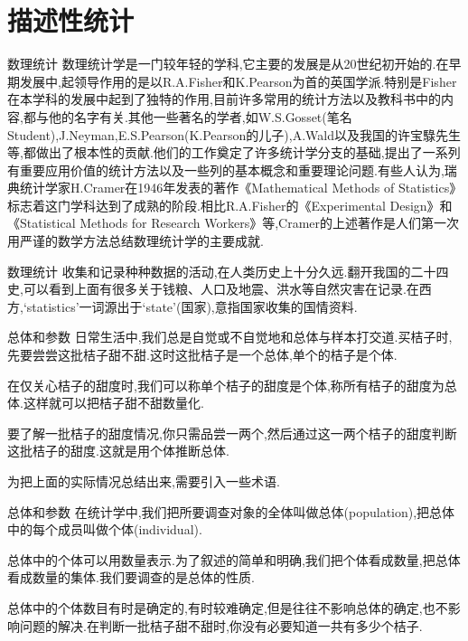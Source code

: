 \section{描述性统计}
    
    \frame{\sectionpage}
    
    \begin{frame}{数理统计}
数理统计学是一门较年轻的学科,它主要的发展是从20世纪初开始的.在早期发展中,起领导作用的是以R.A.Fisher和K.Pearson为首的英国学派.特别是Fisher在本学科的发展中起到了独特的作用,目前许多常用的统计方法以及教科书中的内容,都与他的名字有关.其他一些著名的学者,如W.S.Gosset(笔名Student),J.Neyman,E.S.Pearson(K.Pearson的儿子),A.Wald以及我国的许宝騄先生等,都做出了根本性的贡献.他们的工作奠定了许多统计学分支的基础,提出了一系列有重要应用价值的统计方法以及一些列的基本概念和重要理论问题.有些人认为,瑞典统计学家H.Cramer在1946年发表的著作《Mathematical Methods of Statistics》标志着这门学科达到了成熟的阶段.相比R.A.Fisher的《Experimental Design》和《Statistical Methods for Research Workers》等,Cramer的上述著作是人们第一次用严谨的数学方法总结数理统计学的主要成就.
\end{frame}


\begin{frame}{数理统计}
收集和记录种种数据的活动,在人类历史上十分久远.翻开我国的二十四史,可以看到上面有很多关于钱粮、人口及地震、洪水等自然灾害在记录.在西方,‘statistics’一词源出于‘state'(国家),意指国家收集的国情资料.

\end{frame}

\begin{frame}{总体和参数}
日常生活中,我们总是自觉或不自觉地和总体与样本打交道.买桔子时,先要尝尝这批桔子甜不甜.这时这批桔子是一个总体,单个的桔子是个体.

在仅关心桔子的甜度时,我们可以称单个桔子的甜度是个体,称所有桔子的甜度为总体.这样就可以把桔子甜不甜数量化.

要了解一批桔子的甜度情况,你只需品尝一两个,然后通过这一两个桔子的甜度判断这批桔子的甜度.这就是用个体推断总体.

为把上面的实际情况总结出来,需要引入一些术语.
\end{frame}

\begin{frame}{总体和参数}
在统计学中,我们把所要调查对象的全体叫做\alert{总体}(population),把总体中的每个成员叫做\alert{个体}(individual).

总体中的个体可以用数量表示.为了叙述的简单和明确,我们把个体看成数量,把总体看成数量的集体.我们要调查的是总体的性质.

总体中的个体数目有时是确定的,有时较难确定,但是往往不影响总体的确定,也不影响问题的解决.在判断一批桔子甜不甜时,你没有必要知道一共有多少个桔子.
\end{frame}

